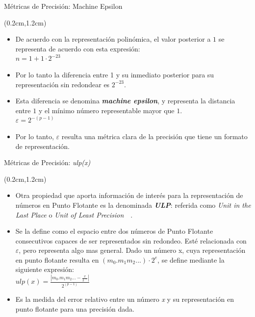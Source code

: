 \documentclass[usenames,table,dvipsnames,aspectratio=169]{beamer}
\begin{document}
\begin{frame}{Métricas de Precisión: Machine Epsilon}
 \begin{textblock*}{\textwidth}(0.2cm,1.2cm)
  \begin{itemize} [<+->]\justifying \parskip .2cm
   \item De acuerdo con la representación polinómica, el valor posterior a $1$ se representa de acuerdo con esta expresión:\\
   \centering $n = 1 + 1\cdot 2^{-23}$
   \item Por lo tanto la diferencia entre 1 y su inmediato posterior para su representación sin redondear es $2^{-23}$.
   \item Esta diferencia se denomina \textbf{\textit{machine epsilon}}, y representa la distancia entre $1$ y el mínimo número representable mayor que $1$.\\
   \centering $ \varepsilon = 2^{-(p-1)}$
   \item Por lo tanto, $\varepsilon$ resulta una métrica clara de la precisión que tiene un formato de representación.
  \end{itemize}
 \end{textblock*}
\end{frame}

\begin{frame}{Métricas de Precisión: \textit{ulp(x)}}
 \begin{textblock*}{\textwidth}(0.2cm,1.2cm)
  \begin{itemize} [<+(1)->]\justifying \parskip .2cm
   \item Otra propiedad que aporta información de interés para la representación de números en Punto Flotante es la denominada \textbf{\textit{ULP}}: referida como \textit{Unit in the Last Place} o \textit{Unit of Least Precision}~\cite{Overton2001}~\cite{Higham2002}.
   \item Se la define como el espacio entre dos números de Punto Flotante consecutivos capaces de ser representados sin redondeo. Esté relacionada con $\varepsilon$, pero representa algo mas general. Dado un número x, cuya representación en punto flotante resulta en $(m_{0}.m_{1}m_{2}...)\cdot 2^{e}$, se define mediante la siguiente expresión:\\
   \centering $ulp(x) = \frac {|m_{0}.m_{1}m_{2}... - \frac{x}{ 2^{-e}}|} {2^{(p-1)}}$
   \item Es la medida del error relativo entre un número \textit{x} y su representación en punto flotante para una precisión dada.
   \end{itemize}
 \end{textblock*}
\end{frame}
\end{document}
